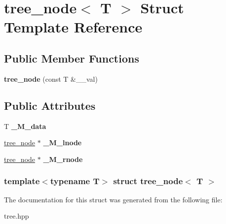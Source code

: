 \hypertarget{structtree__node}{\section{tree\-\_\-node$<$ \-T $>$ \-Struct \-Template \-Reference}
\label{structtree__node}
}
\subsection*{\-Public \-Member \-Functions}
\begin{DoxyCompactItemize}
\item 
\hypertarget{structtree__node_acbe668d05e1e1583f3ae0e43240202d4}{{\bfseries tree\-\_\-node} (const \-T \&\-\_\-\-\_\-val)}\label{structtree__node_acbe668d05e1e1583f3ae0e43240202d4}

\end{DoxyCompactItemize}
\subsection*{\-Public \-Attributes}
\begin{DoxyCompactItemize}
\item 
\hypertarget{structtree__node_a2852f98844006f62d4bb3f7b3fc08413}{\-T {\bfseries \-\_\-\-M\-\_\-data}}\label{structtree__node_a2852f98844006f62d4bb3f7b3fc08413}

\item 
\hypertarget{structtree__node_a5d6f95b74bfcde31d8977fa8c5aedf9c}{\hyperlink{structtree__node}{tree\-\_\-node} $\ast$ {\bfseries \-\_\-\-M\-\_\-lnode}}\label{structtree__node_a5d6f95b74bfcde31d8977fa8c5aedf9c}

\item 
\hypertarget{structtree__node_a71b76f85a6921ba40ccdbfa3a4d6a812}{\hyperlink{structtree__node}{tree\-\_\-node} $\ast$ {\bfseries \-\_\-\-M\-\_\-rnode}}\label{structtree__node_a71b76f85a6921ba40ccdbfa3a4d6a812}

\end{DoxyCompactItemize}
\subsubsection*{template$<$typename \-T$>$ struct tree\-\_\-node$<$ T $>$}



\-The documentation for this struct was generated from the following file\-:\begin{DoxyCompactItemize}
\item 
tree.\-hpp\end{DoxyCompactItemize}
